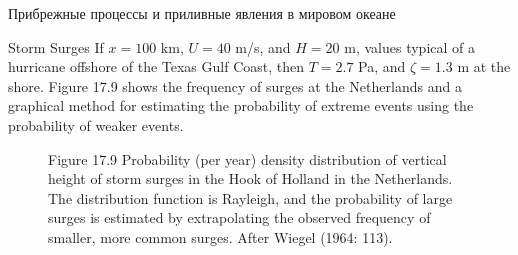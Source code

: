 \begin{chapter}{Прибрежные процессы и приливные явления в мировом океане}
\begin{section}{Storm Surges}
If $x=100$ km, $U=40$ m/s, and $H=20$ m, values typical of a hurricane
offshore of the Texas Gulf Coast, then $T= 2.7$ Pa, and $\zeta = 1.3$
m at the shore. Figure 17.9 shows the frequency of surges at the
Netherlands and a graphical method for estimating the probability of
extreme events using the probability of weaker events.
%

\begin{figure}[t!]
\caption{ Figure 17.9 Probability (per year) density distribution of
vertical height of storm surges in the Hook of Holland in the
Netherlands. The distribution function is Rayleigh, and the
probability of large surges is estimated by extrapolating the observed
frequency of smaller, more common surges. After Wiegel (1964: 113).}
\label{fig:surgeprob}
\vspace{-3ex}
\end{figure}
%
\end{section}


\end{chapter}
